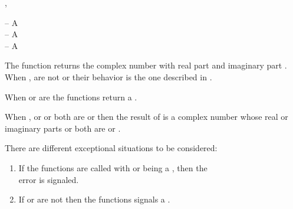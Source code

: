 \documentclass[../Type-Manipulation-Coercion.tex]{subfiles}
\begin{document}

\DSyntax{}

 ,  \RArrow
{}

\DArgsNValues{}

 -- A \\
 -- A \\
 -- A \\

\DDescription{}

The function returns the complex number  with real part
 and imaginary part . When
,  are not  or 
their behavior is the one described in \cite{1996:ANSIHyperSpec}.

\noindent
When  or  are
 the functions return a .

\noindent
When , or  or both are  or
 then the result of  is a complex
number whose real or imaginary parts or both are  or
.

\DExceptional{}

There are different exceptional situations to be considered:
\begin{enumerate}
\item If the functions are called with
   or  being a
  , then the\\
   error is signaled.
\item If  or  are not \CL{}
   then the functions signals a .
\end{enumerate}
\end{document}
